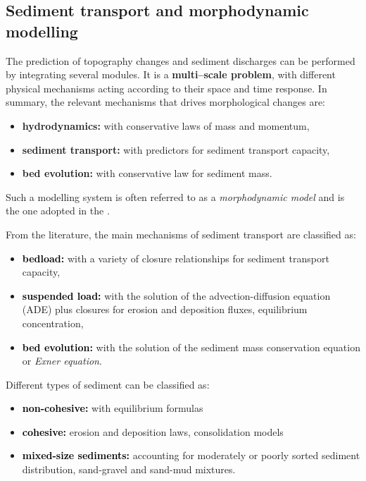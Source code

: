 \subsection{Sediment transport and morphodynamic modelling}
The prediction of topography changes and sediment discharges can be performed by integrating several modules. It is a {\bf multi--scale problem}, with different physical mechanisms acting according to their space and time response. In summary, the relevant mechanisms that drives morphological changes are:
\begin{itemize}
         \item {\bf hydrodynamics:} with conservative laws of mass and momentum,
         \item {\bf sediment transport:} with predictors for sediment transport capacity,
         \item {\bf bed evolution:} with conservative law for sediment mass.
\end{itemize}
\noindent
Such a modelling system is often referred to as a \emph{morphodynamic model} and is the one adopted in the \telemacsystem{}.

\noindent
From the literature, the main mechanisms of sediment transport are classified as:
\begin{itemize}
\item \textcolor{black}{\bf bedload:} with a variety of closure relationships for sediment transport capacity,
\item \textcolor{black}{\bf suspended load:} with the solution of the advection-diffusion equation (ADE) plus closures for erosion and deposition fluxes, equilibrium concentration,
\item \textcolor{black}{\bf bed evolution:} with the solution of the sediment mass conservation equation or \textit{Exner equation}.
\end{itemize}

\noindent
Different types of sediment can be classified as:
\begin{itemize}
\item \textcolor{black}{\bf non-cohesive:} with equilibrium formulas
\item \textcolor{black}{\bf cohesive:} erosion and deposition laws, consolidation models
\item \textcolor{black}{\bf mixed-size sediments:} accounting for moderately or poorly sorted sediment distribution, sand-gravel and sand-mud mixtures.
\end{itemize}
\noindent


